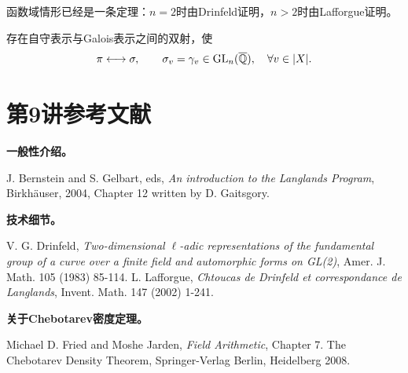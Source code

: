 函数域情形已经是一条定理：$n=2$时由Drinfeld证明，$n>2$时由Lafforgue证明。
\begin{theorem}\label{L9S2O4}
存在自守表示与Galois表示之间的双射，使
\[\pi\longleftrightarrow\sigma,\qquad\sigma_v=\gamma_v\in\operatorname{GL}_n(\overline{\mathbb{Q}}),\quad\forall v\in|X|.\]
\end{theorem}
\section{第9讲参考文献}\label{L9S3}
\textbf{一般性介绍。}
\begin{references}
 J. Bernstein and S. Gelbart, eds, \emph{An introduction to the Langlands Program}, Birkhäuser, 2004, Chapter 12 written by D. Gaitsgory.
\end{references}
\textbf{技术细节。}
\begin{references}
 V. G. Drinfeld, \emph{Two-dimensional $\ell$-adic representations of the fundamental group of a curve over a finite field and automorphic forms on GL(2)}, Amer. J. Math. 105 (1983) 85-114.
 L. Lafforgue, \emph{Chtoucas de Drinfeld et correspondance de Langlands}, Invent. Math. 147 (2002) 1-241.
\end{references}
\textbf{关于Chebotarev密度定理。}
\begin{references}
 Michael D. Fried and Moshe Jarden, \emph{Field Arithmetic}, Chapter 7. The Chebotarev Density Theorem, Springer-Verlag Berlin, Heidelberg 2008.
\end{references}
